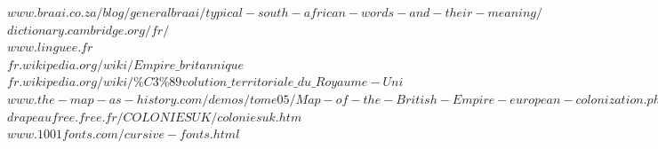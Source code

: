 \documentclass[11pt, a4paper]{report}
\begin{document}
$www.braai.co.za/blog/generalbraai/typical-south-african-words-and-their-meaning/$\\

$dictionary.cambridge.org/fr/$\\

$www.linguee.fr$\\

$fr.wikipedia.org/wiki/Empire\_britannique$\\

$fr.wikipedia.org/wiki/\%C3\%89volution\_territoriale\_du\_Royaume-Uni$\\

$www.the-map-as-history.com/demos/tome05/Map-of-the-British-Empire-european-colonization.php$\\

$drapeaufree.free.fr/COLONIESUK/coloniesuk.htm$\\

$www.1001fonts.com/cursive-fonts.html$\\
\end{document}
